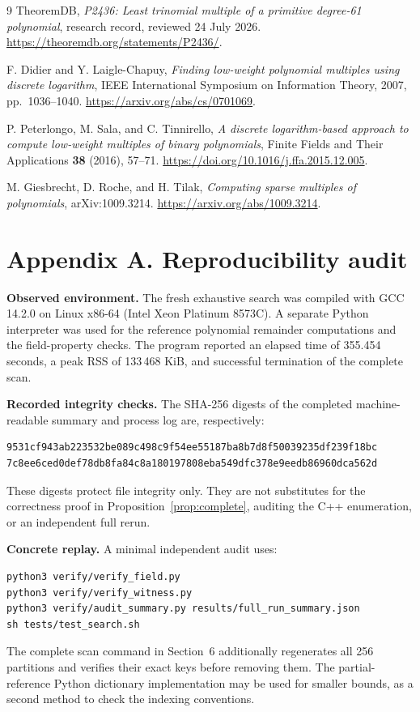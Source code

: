 \documentclass[11pt,a4paper]{article}
\begin{document}
\clearpage
\begin{thebibliography}{9}
TheoremDB, \emph{P2436: Least trinomial multiple of a primitive degree-61
polynomial}, research record, reviewed 24 July 2026.
\url{https://theoremdb.org/statements/P2436/}.

F. Didier and Y. Laigle-Chapuy, \emph{Finding low-weight polynomial
multiples using discrete logarithm}, IEEE International Symposium on
Information Theory, 2007, pp.~1036--1040.
\url{https://arxiv.org/abs/cs/0701069}.

P. Peterlongo, M. Sala, and C. Tinnirello, \emph{A discrete logarithm-based
approach to compute low-weight multiples of binary polynomials},
Finite Fields and Their Applications \textbf{38} (2016), 57--71.
\url{https://doi.org/10.1016/j.ffa.2015.12.005}.

M. Giesbrecht, D. Roche, and H. Tilak, \emph{Computing sparse multiples
of polynomials}, arXiv:1009.3214.
\url{https://arxiv.org/abs/1009.3214}.
\end{thebibliography}

\section*{Appendix A. Reproducibility audit}
\noindent\textbf{Observed environment.} The fresh exhaustive search was
compiled with GCC 14.2.0 on Linux x86-64 (Intel Xeon Platinum 8573C).
A separate Python interpreter was used for the reference polynomial
remainder computations and the field-property checks. The program
reported an elapsed time of 355.454 seconds, a peak RSS of
133\,468 KiB, and successful termination of the complete scan.

\noindent\textbf{Recorded integrity checks.} The SHA-256 digests of the
completed machine-readable summary and process log are, respectively:
\begin{lstlisting}
9531cf943ab223532be089c498c9f54ee55187ba8b7d8f50039235df239f18bc
7c8ee6ced0def78db8fa84c8a180197808eba549dfc378e9eedb86960dca562d
\end{lstlisting}
These digests protect file integrity only. They are not substitutes for
the correctness proof in Proposition~\ref{prop:complete}, auditing the
C++ enumeration, or an independent full rerun.

\noindent\textbf{Concrete replay.} A minimal independent audit uses:
\begin{lstlisting}
python3 verify/verify_field.py
python3 verify/verify_witness.py
python3 verify/audit_summary.py results/full_run_summary.json
sh tests/test_search.sh
\end{lstlisting}
The complete scan command in Section~6 additionally regenerates all
256 partitions and verifies their exact keys before removing them. The
partial-reference Python dictionary implementation may be used for
smaller bounds, as a second method to check the indexing conventions.
\end{document}
